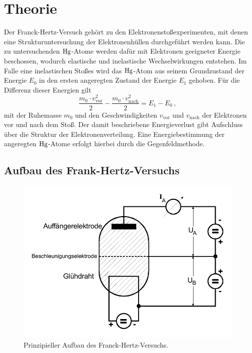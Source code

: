 \section{Theorie}
\label{sec:Theorie}

Der Franck-Hertz-Versuch gehört zu den Elektronenstoßexperimenten, 
mit denen eine Strukturuntersuchung der Elektronenhüllen durchgeführt werden kann.
Die zu untersuchenden $\ce{Hg}$-Atome werden dafür mit Elektronen geeigneter Energie beschossen, 
wodurch elastische und inelastische Wechselwirkungen entstehen.
Im Falle eine inelastischen Stoßes wird das $\ce{Hg}$-Atom aus seinem Grundzustand der Energie $E_0$
in den ersten angeregten Zustand der Energie $E_1$ gehoben.
Für die Differenz dieser Energien gilt
\begin{equation}
    \frac{m_{0} \cdot v_{\text{vor}}^{2}}{2}-\frac{m_{0} \cdot v_{\text{nach}}^{2}}{2}=E_{1}-E_{0} \, ,
\end{equation}
mit der Ruhemasse $m_0$ und den Geschwindigkeiten $v_{\text{vor}}$ und $v_{\text{nach}}$ der Elektronen vor und nach dem Stoß.
Der damit beschriebene Energieverlust gibt Aufschluss über die Struktur der Elektronenverteilung.
Eine Energiebestimmung der angeregten $\ce{Hg}$-Atome erfolgt hierbei durch die Gegenfeldmethode.


\subsection{Aufbau des Frank-Hertz-Versuchs}\label{subsec:aufbau}

\begin{figure}
    \centering
    \includegraphics[width=0.6\linewidth]{pictures/aufbau.pdf}
    \caption{Prinzipieller Aufbau des Franck-Hertz-Versuchs. \cite{v601}}
    \label{fig:aufbau}
\end{figure}


